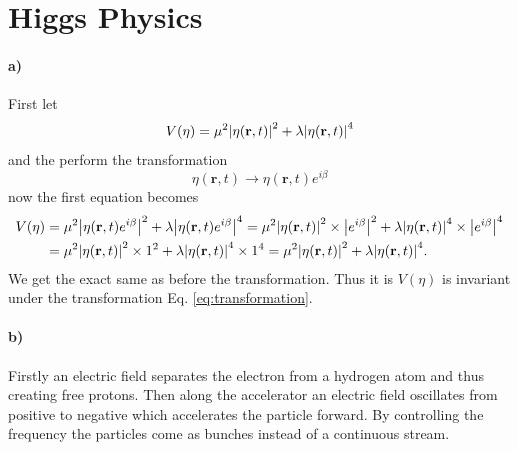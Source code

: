 \section{Higgs Physics}
\paragraph{a)}
First let
\begin{equation}
	V(\eta) = \mu^2 \abs{\eta(\mathbf{r}, t)}^2 + \lambda \abs{\eta(\mathbf{r}, t)}^4
\end{equation}
and the perform the transformation
\begin{equation}
	\eta(\mathbf{r}, t) \to \eta(\mathbf{r}, t) e^{i\beta} \label{eq:transformation}
\end{equation}
now the first equation becomes
\begin{align}
	V(\eta) &= \mu^2 \abs{\eta(\mathbf{r}, t) e^{i\beta}}^2 + \lambda \abs{\eta(\mathbf{r}, t) e^{i\beta}}^4 = \mu^2 \abs{\eta(\mathbf{r}, t)}^2 \times \abs{e^{i\beta}}^2 + \lambda \abs{\eta(\mathbf{r}, t)}^4 \times \abs{e^{i\beta}}^4\\
	&= \mu^2 \abs{\eta(\mathbf{r}, t)}^2 \times 1^2 + \lambda \abs{\eta(\mathbf{r}, t)}^4 \times 1^4 = \mu^2 \abs{\eta(\mathbf{r}, t)}^2 + \lambda \abs{\eta(\mathbf{r}, t)}^4.
\end{align}
We get the exact same as before the transformation. Thus it is $V(\eta)$ is invariant under the transformation Eq. \eqref{eq:transformation}.

\paragraph{b)} Firstly an electric field separates the electron from a hydrogen atom and thus creating free protons. Then along the accelerator an electric field oscillates from positive to negative which accelerates the particle forward. By controlling the frequency the particles come as bunches instead of a continuous stream.

